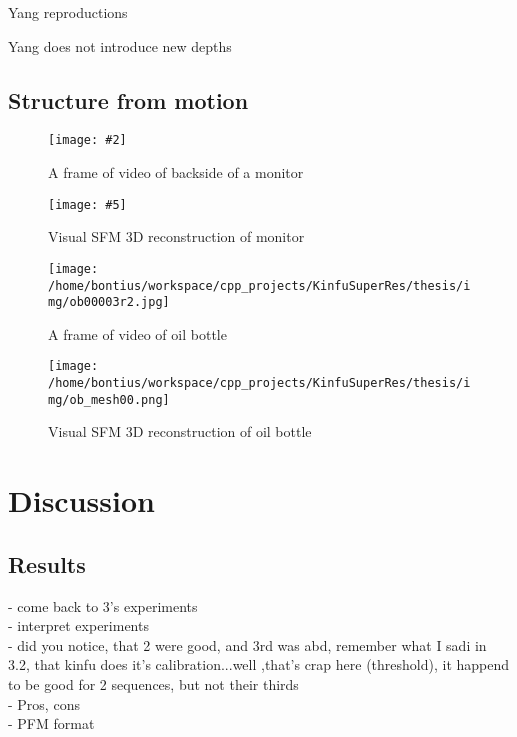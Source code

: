 \documentclass{ucl_thesis}
\newcommand{\myfig}[6]{%
\begin{figure}[h!]\centering%
	\begin{minipage}[b]{0.49\linewidth}\centering%
		\texttt{[image: \#2]}%
		\caption{#3}%
		\label{fig:#1}%
	\end{minipage}%
	\begin{minipage}[b]{0.49\linewidth}\centering%
		\texttt{[image: \#5]}%
		\caption{#6}%
		\label{fig:#4}%
	\end{minipage}%
\end{figure}%
}
\begin{document}
Yang reproductions

Yang does not introduce new depths

\section{Structure from motion} 
\label{sec:sfm}

\myfig
{acerlit_1}
{/home/bontius/workspace/cpp_projects/KinfuSuperRes/thesis/img/acer_lit00706.jpg}
{A frame of video of backside of a monitor}
{acerlit_mesh}
{/home/bontius/workspace/cpp_projects/KinfuSuperRes/thesis/img/acer_lit01.png}
{Visual SFM 3D reconstruction of monitor} 

\begin{figure}[h!]\centering
	\begin{minipage}[b]{0.49\linewidth}\centering
		\texttt{[image: /home/bontius/workspace/cpp\_projects/KinfuSuperRes/thesis/img/ob00003r2.jpg]}
		\caption{A frame of video of oil bottle}
		\label{fig:ob_1}
	\end{minipage}
	\begin{minipage}[b]{0.49\linewidth}\centering
		\texttt{[image: /home/bontius/workspace/cpp\_projects/KinfuSuperRes/thesis/img/ob\_mesh00.png]}
		\caption{Visual SFM 3D reconstruction of oil bottle}
		\label{fig:ob_mesh}
	\end{minipage}
\end{figure}





\chapter{Discussion} 
\label{chp:discussion}

\section{Results}
\label{sec:discussion_results}

    - come back to 3's experiments\\
    - interpret experiments\\
    - did you notice, that 2 were good, and 3rd was abd, remember what I sadi in 3.2, that kinfu does it's calibration...well ,that's crap here (threshold), it happend to be good for 2 sequences, but not their thirds \\
-     Pros, cons \\
- PFM format \\
\end{document}
